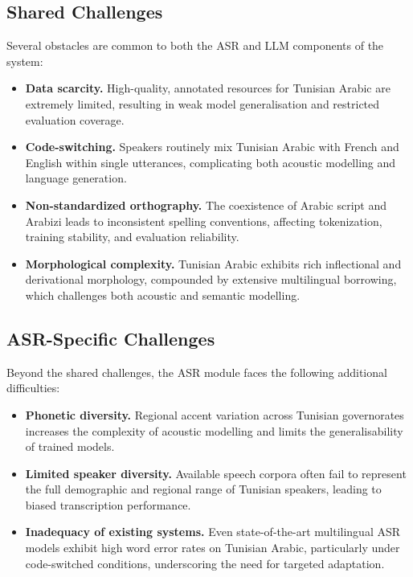 \documentclass[12pt,a4paper]{report}
\begin{document}
\subsection{Shared Challenges}

Several obstacles are common to both the ASR and LLM components of the system:

\begin{itemize}
    \item \textbf{Data scarcity.} High-quality, annotated resources for Tunisian Arabic
          are extremely limited, resulting in weak model generalisation and restricted
          evaluation coverage.

    \item \textbf{Code-switching.} Speakers routinely mix Tunisian Arabic with French
          and English within single utterances, complicating both acoustic modelling and
          language generation.

    \item \textbf{Non-standardized orthography.} The coexistence of Arabic script and
          Arabizi leads to inconsistent spelling conventions, affecting tokenization,
          training stability, and evaluation reliability.

    \item \textbf{Morphological complexity.} Tunisian Arabic exhibits rich inflectional
          and derivational morphology, compounded by extensive multilingual borrowing,
          which challenges both acoustic and semantic modelling.
\end{itemize}

\subsection{ASR-Specific Challenges}

Beyond the shared challenges, the ASR module faces the following additional difficulties:

\begin{itemize}
    \item \textbf{Phonetic diversity.} Regional accent variation across Tunisian
          governorates increases the complexity of acoustic modelling and limits the
          generalisability of trained models.

    \item \textbf{Limited speaker diversity.} Available speech corpora often fail to
          represent the full demographic and regional range of Tunisian speakers, leading
          to biased transcription performance.

    \item \textbf{Inadequacy of existing systems.} Even state-of-the-art multilingual
          ASR models exhibit high word error rates on Tunisian Arabic, particularly under
          code-switched conditions, underscoring the need for targeted adaptation.
\end{itemize}
\end{document}
